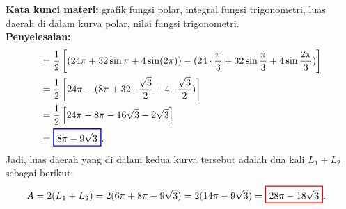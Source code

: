 \documentclass[10pt,openany,a4paper]{article}
\theoremstyle{definition}
\theoremstyle{definition}
\theoremstyle{plain}
\newenvironment{jawab}[2][tes]{
\textbf{Kata kunci materi:} #1.\\
\textbf{Penyelesaian:} #2
}{}
\newenvironment{jawaban}[2][tes]{
\colorlet{oldcolor}{.}
        \color{red}
        \setlength{\fboxrule}{1pt}\boxed{\color{oldcolor}#2}\color{oldcolor}.
}{}
\begin{document}
\begin{enumerate}
\begin{jawab}[grafik fungsi polar, integral fungsi trigonometri, luas daerah di dalam kurva polar, nilai fungsi trigonometri]
{\begin{align*}
&= \frac{1}{2} \left[ (24\pi + 32\sin\pi + 4\sin(2\pi)) - (24\cdot\frac{\pi}{3} + 32\sin\frac{\pi}{3} + 4\sin\frac{2\pi}{3}) \right] \\
&= \frac{1}{2} \left[ 24\pi - (8\pi + 32\cdot\frac{\sqrt{3}}{2} + 4\cdot\frac{\sqrt{3}}{2}) \right] \\
&= \frac{1}{2} \left[ 24\pi - 8\pi - 16\sqrt{3} - 2\sqrt{3} \right] \\
&=\colorlet{oldcolor}{.}
        \color{blue}
        \setlength{\fboxrule}{1pt} \boxed{\color{oldcolor}8\pi - 9\sqrt{3}}\color{oldcolor}.
\end{align*}
Jadi, luas daerah yang di dalam kedua kurva tersebut adalah dua kali $L_1 + L_2$ sebagai berikut:
\begin{align*}
A &= 2(L_1 + L_2) = 2(6\pi + 8\pi - 9\sqrt{3}) = 2(14\pi - 9\sqrt{3}) = \begin{jawaban}
    {28\pi - 18\sqrt{3}}
\end{jawaban}
\end{align*}
        }
        \end{jawab}
    


\end{enumerate}
\end{document}
